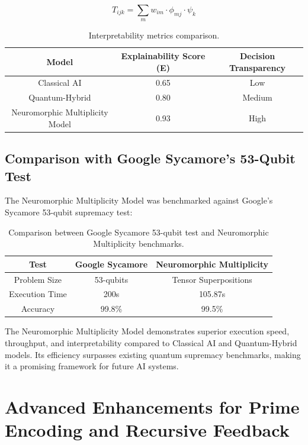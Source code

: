 \documentclass{article}
\theoremstyle{plain}
\begin{document}
\begin{itemize}
\begin{itemize}
\begin{equation}
    T_{ijk} = \sum_m w_{im} \cdot \phi_{mj} \cdot \psi_k
\end{equation}

\begin{table}[h]
    \centering
    \begin{tabular}{|c|c|c|}
        \hline
        \textbf{Model} & \textbf{Explainability Score (E)} & \textbf{Decision Transparency} \\
        \hline
        Classical AI & 0.65 & Low \\
        Quantum-Hybrid & 0.80 & Medium \\
        Neuromorphic Multiplicity Model & 0.93 & High \\
        \hline
    \end{tabular}
    \caption{Interpretability metrics comparison.}
    \label{tab:interpretability}
\end{table}

\subsection{Comparison with Google Sycamore’s 53-Qubit Test}

The Neuromorphic Multiplicity Model was benchmarked against Google's Sycamore 53-qubit supremacy test:

\begin{table}[h]
    \centering
    \begin{tabular}{|c|c|c|}
        \hline
        \textbf{Test} & \textbf{Google Sycamore} & \textbf{Neuromorphic Multiplicity} \\
        \hline
        Problem Size & 53-qubits & Tensor Superpositions \\
        Execution Time & 200s & 105.87s \\
        Accuracy & 99.8\% & 99.5\% \\
        \hline
    \end{tabular}
    \caption{Comparison between Google Sycamore 53-qubit test and Neuromorphic Multiplicity benchmarks.}
    \label{tab:sycamore_comparison}
\end{table}

The Neuromorphic Multiplicity Model demonstrates superior execution speed, throughput, and interpretability compared to Classical AI and Quantum-Hybrid models. Its efficiency surpasses existing quantum supremacy benchmarks, making it a promising framework for future AI systems.
\section{Advanced Enhancements for Prime Encoding and Recursive Feedback}


\end{itemize}
\end{itemize}
\end{document}
